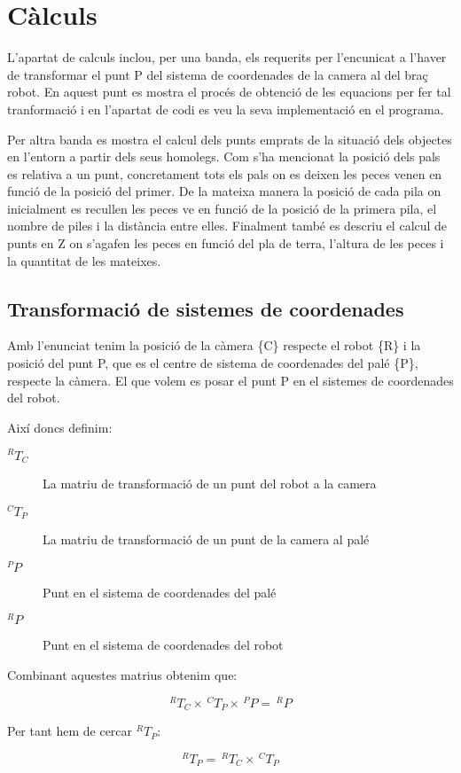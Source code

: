 \section{Càlculs}
L'apartat de calculs inclou, per una banda, els requerits per l'encunicat a l'haver de transformar
el punt P del sistema de coordenades de la camera al del braç robot. En aquest punt es mostra
el procés de obtenció de les equacions per fer tal tranformació i en l'apartat de codi
es veu la seva implementació en el programa.

Per altra banda es mostra el calcul dels punts emprats de la situació dels objectes en l'entorn
a partir dels seus homolegs. Com s'ha mencionat la posició dels pals es relativa a un punt,
concretament tots els pals on es deixen les peces venen en funció de la posició del primer.
De la mateixa manera la posició de cada pila on inicialment es recullen les peces
ve en funció de la posició de la primera pila, el nombre de piles i la distància entre elles.
Finalment també es descriu el calcul de punts en Z on s'agafen les peces en funció del pla
de terra, l'altura de les peces i la quantitat de les mateixes.

\subsection{Transformació de sistemes de coordenades}
Amb l'enunciat tenim la posició de la càmera \{C\} respecte el robot \{R\} i
la posició del punt P, que es el centre de sistema de coordenades del palé \{P\},
respecte la càmera. El que volem es posar el punt P en el sistemes de coordenades del robot.

Així doncs definim:

\begin{description}
\item[$^RT_C$] La matriu de transformació de un punt del robot a la camera
\item[$^CT_P$] La matriu de transformació de un punt de la camera al palé
\item[$^PP$] Punt en el sistema de coordenades del palé
\item[$^RP$] Punt en el sistema de coordenades del robot
\end{description}

Combinant aquestes matrius obtenim que:

$$ ^RT_C \times \,^CT_P \times \,^PP = \,^RP $$

Per tant hem de cercar $^RT_P$:

$$ ^RT_P = \,^RT_C \times \,^CT_P $$

